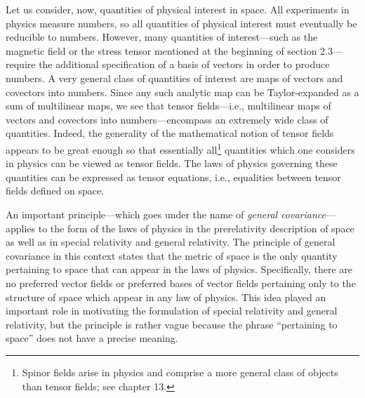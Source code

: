 Let us consider, now, quantities of physical interest in space. All experiments in
physics measure numbers, so all quantities of physical interest must eventually be
reducible to numbers. However, many quantities of interest---such as the magnetic
field or the stress tensor mentioned at the beginning of section 2.3---require the
additional specification of a basis of vectors in order to produce numbers. A very
general class of quantities of interest are maps of vectors and covectors into
numbers. Since any such analytic map can be Taylor-expanded as a sum of
multilinear maps, we see that tensor fields---i.e., multilinear maps of vectors and
covectors into numbers---encompass an extremely wide class of quantities. Indeed,
the generality of the mathematical notion of tensor fields appears to be great
enough so that essentially all\footnote{Spinor fields arise in physics and comprise
a more general class of objects than tensor fields; see chapter 13.} quantities
which one considers in physics can be viewed as tensor fields. The laws of physics
governing these quantities can be expressed as tensor equations, i.e., equalities
between tensor fields defined on space.

An important principle---which goes under the name of \emph{general
covariance}---applies to the form of the laws of physics in the prerelativity
description of space as well as in special relativity and general relativity. The
principle of general covariance in this context states that the metric of space is
the only quantity pertaining to space that can appear in the laws of physics.
Specifically, there are no preferred vector fields or preferred bases of vector
fields pertaining only to the structure of space which appear in any law of
physics. This idea played an important role in motivating the formulation of
special relativity and general relativity, but the principle is rather vague because
the phrase \textquotedblleft pertaining to space\textquotedblright{} does not have
a precise meaning.

